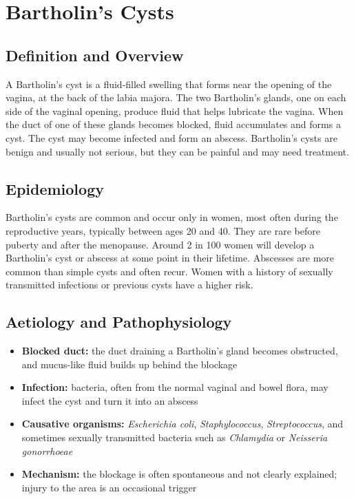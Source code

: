 \chapter{Bartholin's Cysts}

\section*{Definition and Overview}
A Bartholin's cyst is a fluid-filled swelling that forms near the opening of the vagina, at the back of the labia majora. The two Bartholin's glands, one on each side of the vaginal opening, produce fluid that helps lubricate the vagina. When the duct of one of these glands becomes blocked, fluid accumulates and forms a cyst. The cyst may become infected and form an abscess. Bartholin's cysts are benign and usually not serious, but they can be painful and may need treatment.

\section*{Epidemiology}
Bartholin's cysts are common and occur only in women, most often during the reproductive years, typically between ages 20 and 40. They are rare before puberty and after the menopause. Around 2 in 100 women will develop a Bartholin's cyst or abscess at some point in their lifetime. Abscesses are more common than simple cysts and often recur. Women with a history of sexually transmitted infections or previous cysts have a higher risk.

\section*{Aetiology and Pathophysiology}
\begin{itemize}
    \item \textbf{Blocked duct:} the duct draining a Bartholin's gland becomes obstructed, and mucus-like fluid builds up behind the blockage
    \item \textbf{Infection:} bacteria, often from the normal vaginal and bowel flora, may infect the cyst and turn it into an abscess
    \item \textbf{Causative organisms:} \textit{Escherichia coli}, \textit{Staphylococcus}, \textit{Streptococcus}, and sometimes sexually transmitted bacteria such as \textit{Chlamydia} or \textit{Neisseria gonorrhoeae}
    \item \textbf{Mechanism:} the blockage is often spontaneous and not clearly explained; injury to the area is an occasional trigger
\end{itemize}

